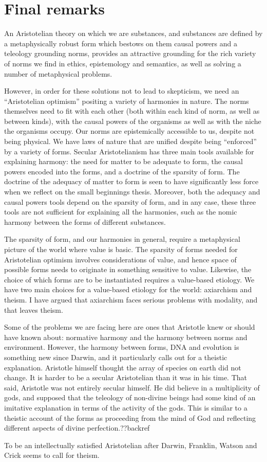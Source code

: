 \section{Final remarks}
An Aristotelian theory on which we are substances, and substances are defined by a metaphysically robust form which bestows
on them causal powers and a teleology grounding norms, provides an attractive grounding for the rich variety of norms we 
find in ethics, epistemology and semantics, as well as solving a number of metaphysical problems. 

However, in order for 
these solutions not to lead to skepticism, we need an ``Aristotelian optimism'' positing a variety of harmonies in nature. 
The norms themselves need to fit with each other (both within each 
kind of norm, as well as between kinds), with the causal powers of the organisms as well as with the niche the organisms 
occupy. Our norms are epistemically accessible to us, despite not being physical. We have laws of nature that are unified
despite being ``enforced'' by a variety of forms. Secular Aristotelianism has three main tools available for explaining harmony: the need for matter to be adequate to form, the causal powers encoded into the forms, and a doctrine of the sparsity of form. The doctrine of the adequacy of matter to form is seen to have significantly less force when we reflect on the small beginnings thesis. Moreover, both the adequacy and causal powers tools depend on the sparsity of form, and in any case, these three tools are not sufficient for explaining all the harmonies, such as the nomic harmony between the forms of different substances.

The sparsity of form, and our harmonies in general, require a metaphysical picture of the world where value is basic. The sparsity of forms needed for Aristotelian optimism involves considerations of value, and hence space of possible forms needs to originate in something sensitive to value. Likewise, the choice of which forms are to be instantiated requires a value-based etiology. We have two main choices for a value-based etiology for the world: axiarchism and theism. I have argued that axiarchism faces serious problems with modality, and that leaves theism.

Some of the problems we are facing here are ones that Aristotle knew or should have known about: normative harmony and the harmony between norms and environment. However, the harmony between forms, DNA and evolution is something new since Darwin, and it particularly calls out for a theistic explanation. Aristotle himself thought the array of species on earth did not change. It is harder to be a secular Aristotelian than it was in his time. That said, Aristotle was not entirely secular himself. He did believe in a multiplicity of gods, and supposed that the teleology of non-divine beings had some kind of an imitative explanation in terms of the activity of the gods. This is similar to a theistic account of the forms as proceeding from the mind of God and reflecting different aspects of divine perfection.??backref

To be an intellectually satisfied Aristotelian after Darwin, Franklin, Watson and Crick seems to call for theism.

\chaptertail

